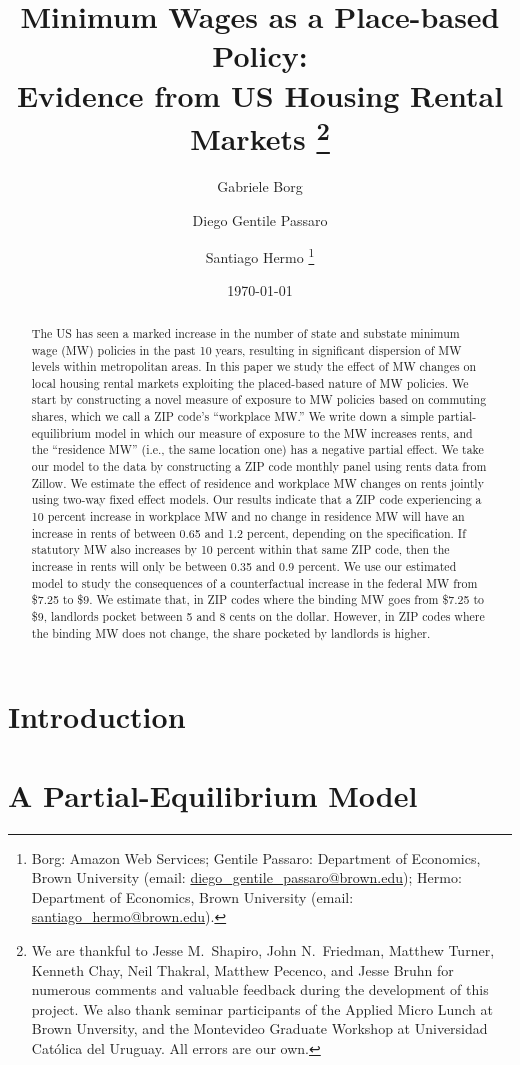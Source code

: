 \documentclass{article}
\title{ Minimum Wages as a Place-based Policy: \\
        Evidence from US Housing Rental Markets
        \thanks{We are thankful to Jesse M.\ Shapiro, John N.\ Friedman, Matthew Turner, 
        Kenneth Chay, Neil Thakral, Matthew Pecenco, and Jesse Bruhn for numerous 
        comments and valuable feedback during the development of this project.
        We also thank seminar participants of the Applied Micro Lunch at Brown
        Unversity, and the Montevideo Graduate Workshop at Universidad Católica del
        Uruguay.
        All errors are our own.}}
\author{Gabriele Borg \and Diego Gentile Passaro \and Santiago Hermo
        \footnote{
        Borg: Amazon Web Services; 
        Gentile Passaro: Department of Economics, Brown University 
        (email: \url{diego_gentile_passaro@brown.edu}); 
        Hermo: Department of Economics, Brown University 
        (email: \url{santiago_hermo@brown.edu}).}}
\date{\today}
\begin{document}
\maketitle

\begin{abstract}
    \noindent
    The US has seen a marked increase in the number of state and substate minimum 
    wage (MW) policies in the past 10 years, resulting in significant dispersion 
    of MW levels within metropolitan areas.
    In this paper we study the effect of MW changes on local housing rental 
    markets exploiting the placed-based nature of MW policies.
    We start by constructing a novel measure of exposure to MW policies based on 
    commuting shares, which we call a ZIP code's ``workplace MW.''
    We write down a simple partial-equilibrium model in which our measure of 
    exposure to the MW increases rents, and the ``residence MW'' (i.e., the same 
    location one) has a negative partial effect.
    We take our model to the data by constructing a ZIP code monthly panel using 
    rents data from Zillow.
    We estimate the effect of residence and workplace MW changes on rents jointly 
    using two-way fixed effect models.
    Our results indicate that a ZIP code experiencing a 10 percent increase in 
    workplace MW and no change in residence MW will have an increase in rents of 
    between 0.65 and 1.2 percent, depending on the specification.
    If statutory MW also increases by 10 percent within that same ZIP code, then
    the increase in rents will only be between 0.35 and 0.9 percent.
    We use our estimated model to study the consequences of a counterfactual
    increase in the federal MW from \$7.25 to \$9.
    We estimate that, in ZIP codes where the binding MW goes from \$7.25 to \$9,
    landlords pocket between 5 and 8 cents on the dollar.
    However, in ZIP codes where the binding MW does not change, the share pocketed
    by landlords is higher.
\end{abstract}

\vspace{5mm}


\clearpage

\section{Introduction}\label{sec:intro}
    

\section{A Partial-Equilibrium Model}\label{sec:model}
    
\end{document}
